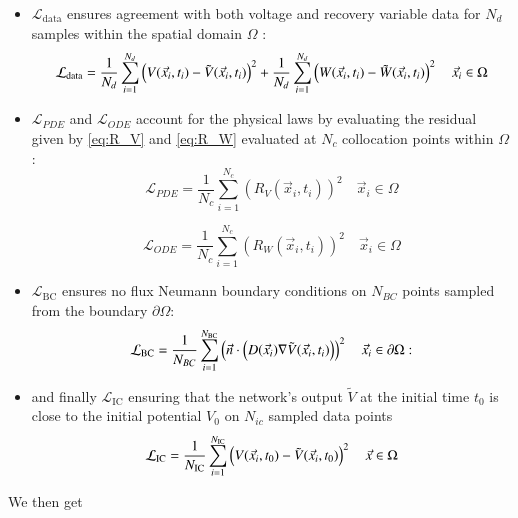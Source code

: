 \begin{itemize}
    \item $\mathcal{L}_{\text{data}}$ ensures agreement with both voltage and recovery variable data for $N_d$ samples within the spatial domain $\Omega$ : \\
    \begin{equation}
    \mathcal{L}_{\text{data}} = \frac{1}{N_{d}} \sum_{i=1}^{N_{d}} \left(V(\vec{x}_i,t_i)-\Tilde{V}(\vec{x}_i,t_i)\right)^2+\frac{1}{N_{d}} \sum_{i=1}^{N_{d}} \left(W(\vec{x}_i,t_i)-\Tilde{W}(\vec{x}_i,t_i)\right)^2\quad \vec{x}_i\in \Omega
\end{equation}
    \item $\mathcal{L}_{PDE}$ and $\mathcal{L}_{ODE}$ account for the physical laws by evaluating the residual given by \eqref{eq:R_V} and \eqref{eq:R_W} evaluated at $N_c$ collocation points within $\Omega$ :
\begin{equation}
    \mathcal{L}_{PDE} = \frac{1}{N_{c}} \sum_{i=1}^{N_{c}} \left(R_{V}(\vec{x}_i, t_i)\right)^2\quad \vec{x}_i\in \Omega
\end{equation} 

\begin{equation}
    \mathcal{L}_{ODE} = \frac{1}{N_{c}} \sum_{i=1}^{N_{c}} \left(R_{W}(\vec{x}_i, t_i)\right)^2\quad \vec{x}_i\in \Omega
\end{equation}

    \item $\mathcal{L}_{\text{BC}}$ ensures no flux Neumann boundary conditions on $N_{BC}$ points sampled from the boundary $\partial \Omega$:
\begin{equation}
\mathcal{L}_{\text{BC}} = \frac{1}{N_{BC}} \sum_{i=1}^{N_{\text{BC}}} \left(\Vec{n} \cdot\left(D(\vec{x}_i)  \nabla\Tilde{V}(\vec{x}_i,t_i)\right)\right)^2\quad \vec{x}_i\in \partial \Omega:   
\end{equation}

\item and finally $\mathcal{L}_{\text{IC}}$ ensuring that the network's output $\tilde{V}$ at the initial time $t_0$ is close to the initial potential $V_0$ on $N_{ic}$ sampled data points
\begin{equation}
    \mathcal{L}_{\text{IC}} = \frac{1}{N_{\text{IC}}} \sum_{i=1}^{N_{\text{IC}}} \left(V(\vec{x}_i,t_0)-\Tilde{V}(\vec{x}_i,t_0)\right)^2\quad \vec{x} \in \Omega
\end{equation}
\end{itemize}

We then get

